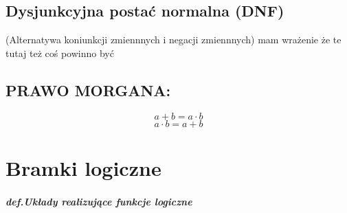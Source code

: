 \documentclass{article}
\begin{document}
\subsection{Dysjunkcyjna postać normalna (DNF)}
(Alternatywa koniunkcji zmiennnych i negacji zmiennnych)
mam wrażenie że te tutaj też coś powinno być

\subsection{PRAWO MORGANA:}
\[a + b = a \cdot b\]
\[a \cdot b = a + b\]

\section{Bramki logiczne}

	\subparagraph{\textit{def.}Układy realizujące funkcje logiczne}
\end{document}
